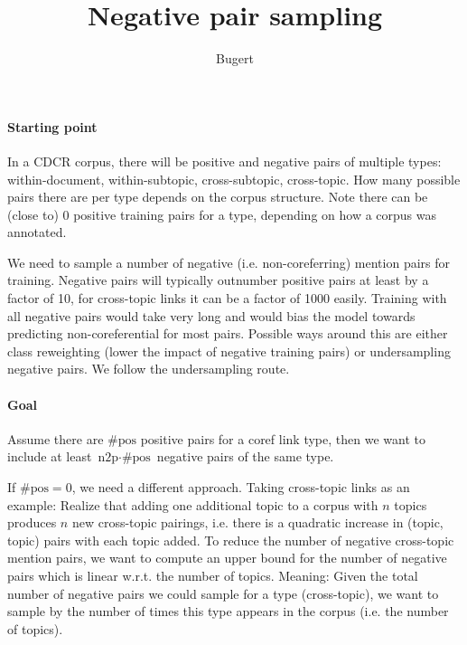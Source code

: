 \documentclass[a4paper]{article}
\title{Negative pair sampling}
\author{Bugert}
\begin{document}
	
\maketitle
	
\paragraph{Starting point} In a CDCR corpus, there will be positive and negative pairs of multiple types: within-document, within-subtopic, cross-subtopic, cross-topic. How many possible pairs there are per type depends on the corpus structure. Note there can be (close to) 0 positive training pairs for a type, depending on how a corpus was annotated.

We need to sample a number of negative (i.e. non-coreferring) mention pairs for training. Negative pairs will typically outnumber positive pairs at least by a factor of 10, for cross-topic links it can be a factor of 1000 easily. Training with all negative pairs would take very long and would bias the model towards predicting non-coreferential for most pairs. Possible ways around this are either class reweighting (lower the impact of negative training pairs) or undersampling negative pairs. We follow the undersampling route.

\paragraph{Goal} Assume there are $\text{\#pos}$ positive pairs for a coref link type, then we want to include at least $\text{n2p} \cdot \text{\#pos}$ negative pairs of the same type.

If $\text{\#pos} = 0$, we need a different approach. Taking cross-topic links as an example: Realize that adding one additional topic to a corpus with $n$ topics produces $n$ new cross-topic pairings, i.e. there is a quadratic increase in (topic, topic) pairs with each topic added. To reduce the number of negative cross-topic mention pairs, we want to compute an upper bound for the number of negative pairs which is linear w.r.t. the number of topics. Meaning: Given the total number of negative pairs we could sample for a type (cross-topic), we want to sample by the number of times this type appears in the corpus (i.e. the number of topics).
\end{document}
